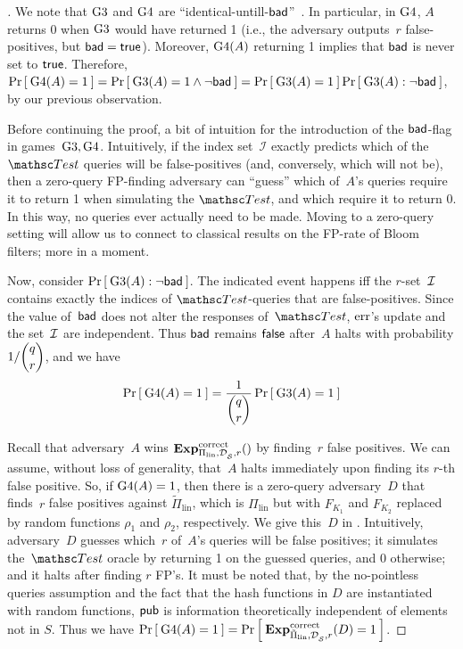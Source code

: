 \begin{proof}[]
We note that $\text{G3}$ and $\text{G4}$ are
``identical-untill-$\mathsf{bad}$''~\cite{BeRo-gameplaying}.  In particular,
in $\text{G4}$, $A$ returns 0 when $\text{G3}$ would have returned 1 (i.e.,
the adversary outputs~$r$ false-positives, but $\mathsf{bad}=\mathsf{true}$).  
Moreover,  $\text{G4}(A)$ returning 1 implies that $\mathsf{bad}$ is never set to $\mathsf{true}$. Therefore,
$\Pr\left[\: \text{G4}(A)=1 \:\right] = \Pr\left[\: \text{G3}(A)=1 \wedge \neg\mathsf{bad} \:\right] =
\Pr\left[\: \text{G3}(A)=1 \:\right] \Pr\left[\: \text{G3}(A) : \neg\mathsf{bad} \:\right]$, by our previous observation.

Before continuing the proof, a bit of intuition for the introduction
of the $\mathsf{bad}$-flag in games~$\text{G3},\text{G4}$.   Intuitively, if the index
set~$\mathcal{I}$ exactly predicts which of the $\Test$ queries will be
false-positives (and, conversely, which will not be), then a
zero-query FP-finding adversary can ``guess'' which of~$A$'s queries require it
to return 1 when simulating the $\Test$, and which require it to
return 0.  In this way, no queries ever actually need to be made.
Moving to a zero-query setting will allow us to connect to classical
results on the FP-rate of Bloom filters; more in a moment. 

Now, consider $\Pr\left[\: \text{G3}(A) : \neg\mathsf{bad} \:\right]$.  The indicated event
happens iff the $r$-set~${\cal I}$ contains exactly the indices of
$\Test$-queries that are false-positives.  Since the value
of~$\mathsf{bad}$ does not alter the responses of~$\Test$, $\mathrm{err}$'s update
and the set~${\cal I}$ are independent.
Thus $\mathsf{bad}$ remains $\mathsf{false}$ after~$A$ halts with probability
$1/\dbinom{q}{r}$, and we have 
\begin{equation*}
\Pr\left[\: \text{G4}(A)=1 \:\right] = \frac{1}{\dbinom{q}{r}}\Pr\left[\: \text{G3}(A)=1 \:\right]
\end{equation*}

Recall that adversary~$A$ wins $\mathrm{\mathbf{Exp}}^{\mathrm{correct}}_{\Pi_{\mathrm{lin}},\mathcal{D}_{{\cal S}}^{},r}()$ by finding~$r$ false positives. We can assume, without loss of generality,  that~$A$ halts immediately upon finding its $r$-th false positive. %
%
So, if $\text{G4}(A)=1$, then there is a zero-query adversary~$D$ that finds~$r$ false positives against $\tilde{\Pi}_{\mathrm{lin}}$, which is $\Pi_{\mathrm{lin}}$ but with $F_{K_1}$ and $F_{K_2}$ replaced by random functions $\rho_1$ and $\rho_2$, respectively.  We give this~$D$ in . Intuitively, adversary~$D$ guesses which~$r$ of~$A$'s queries will be false positives; it simulates the~$\Test$ oracle by returning 1 on the guessed queries, and 0 otherwise; and it halts after finding $r$ FP's. It must be noted that, by the no-pointless queries assumption and the fact that the hash functions in $D$ are instantiated with random functions, ${\sf pub}$ is information theoretically independent of elements not in $S$. Thus we have
$\Pr\left[\: \text{G4}(A)=1 \:\right] =\Pr\left[\: \mathrm{\mathbf{Exp}}^{\mathrm{correct}}_{\tilde{\Pi}_{\mathrm{lin}},\mathcal{D}_{{\cal S}}^{},r}(D) = 1 \:\right]$.


\end{proof}
